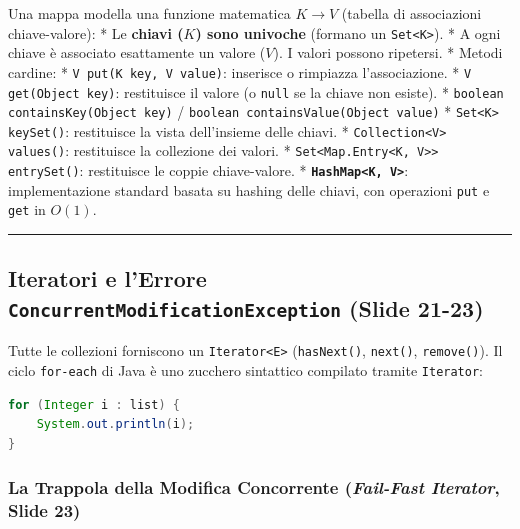 \documentclass[11pt,a4paper,oneside]{report}
\newcommand{\passthrough}[1]{#1}
\begin{document}
Una mappa modella una funzione matematica \(K \to V\) (tabella di
associazioni chiave-valore): * Le \textbf{chiavi (\(K\)) sono univoche}
(formano un \passthrough{\lstinline!Set<K>!}). * A ogni chiave è
associato esattamente un valore (\(V\)). I valori possono ripetersi. *
Metodi cardine: * \passthrough{\lstinline!V put(K key, V value)!}:
inserisce o rimpiazza l'associazione. *
\passthrough{\lstinline!V get(Object key)!}: restituisce il valore (o
\passthrough{\lstinline!null!} se la chiave non esiste). *
\passthrough{\lstinline!boolean containsKey(Object key)!} /
\passthrough{\lstinline!boolean containsValue(Object value)!} *
\passthrough{\lstinline!Set<K> keySet()!}: restituisce la vista
dell'insieme delle chiavi. *
\passthrough{\lstinline!Collection<V> values()!}: restituisce la
collezione dei valori. *
\passthrough{\lstinline!Set<Map.Entry<K, V>> entrySet()!}: restituisce
le coppie chiave-valore. *
\textbf{\passthrough{\lstinline!HashMap<K, V>!}}: implementazione
standard basata su hashing delle chiavi, con operazioni
\passthrough{\lstinline!put!} e \passthrough{\lstinline!get!} in
\textbf{\(O(1)\)}.

\begin{center}\rule{0.5\linewidth}{0.5pt}\end{center}

\subsection{\texorpdfstring{Iteratori e l'Errore
\texttt{ConcurrentModificationException} (Slide
21-23)}{Iteratori e l'Errore ConcurrentModificationException (Slide 21-23)}}\label{chap15_iteratori-e-lerrore-concurrentmodificationexception-slide-21-23}

Tutte le collezioni forniscono un \passthrough{\lstinline!Iterator<E>!}
(\passthrough{\lstinline!hasNext()!}, \passthrough{\lstinline!next()!},
\passthrough{\lstinline!remove()!}). Il ciclo
\passthrough{\lstinline!for-each!} di Java è uno zucchero sintattico
compilato tramite \passthrough{\lstinline!Iterator!}:

\begin{lstlisting}[language=Java]
for (Integer i : list) {
    System.out.println(i);
}
\end{lstlisting}

\subsubsection{\texorpdfstring{La Trappola della Modifica Concorrente
(\emph{Fail-Fast Iterator}, Slide
23)}{La Trappola della Modifica Concorrente (Fail-Fast Iterator, Slide 23)}}\label{chap15_la-trappola-della-modifica-concorrente-fail-fast-iterator-slide-23}
\end{document}
